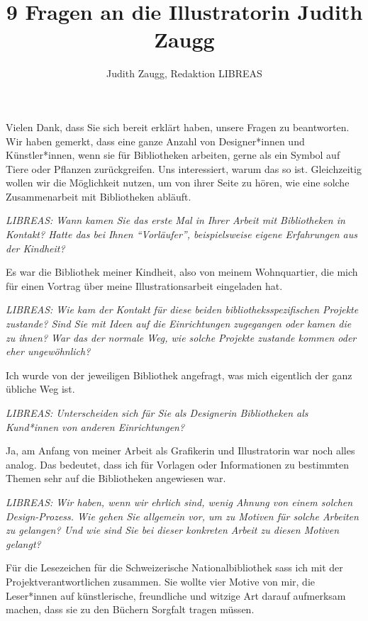 \documentclass[a4paper,
fontsize=11pt,
oneside,
numbers=noperiodatend,
parskip=half-,
bibliography=totoc,
final
]{scrartcl}
\title{\LARGE{9 Fragen an die Illustratorin Judith Zaugg}}%
\author{Judith Zaugg, Redaktion LIBREAS} %
\date{}
\begin{document}
\maketitle
\thispagestyle{fancyplain} 


Vielen Dank, dass Sie sich bereit erklärt haben, unsere Fragen zu
beantworten. Wir haben gemerkt, dass eine ganze Anzahl von
Designer*innen und Künstler*innen, wenn sie für Bibliotheken arbeiten,
gerne als ein Symbol auf Tiere oder Pflanzen zurückgreifen. Uns
interessiert, warum das so ist. Gleichzeitig wollen wir die Möglichkeit
nutzen, um von ihrer Seite zu hören, wie eine solche Zusammenarbeit mit
Bibliotheken abläuft.

\emph{LIBREAS: Wann kamen Sie das erste Mal in Ihrer Arbeit mit
Bibliotheken in Kontakt? Hatte das bei Ihnen \enquote{Vorläufer},
beispielsweise eigene Erfahrungen aus der Kindheit?}

Es war die Bibliothek meiner Kindheit, also von meinem Wohnquartier, die
mich für einen Vortrag über meine Illustrationsarbeit eingeladen hat.

\emph{LIBREAS: Wie kam der Kontakt für diese beiden
bibliotheksspezifischen Projekte zustande? Sind Sie mit Ideen auf die
Einrichtungen zugegangen oder kamen die zu ihnen? War das der normale
Weg, wie solche Projekte zustande kommen oder eher ungewöhnlich?}

Ich wurde von der jeweiligen Bibliothek angefragt, was mich eigentlich
der ganz übliche Weg ist.

\emph{LIBREAS: Unterscheiden sich für Sie als Designerin Bibliotheken
als Kund*innen von anderen Einrichtungen?}

Ja, am Anfang von meiner Arbeit als Grafikerin und Illustratorin war
noch alles analog. Das bedeutet, dass ich für Vorlagen oder
Informationen zu bestimmten Themen sehr auf die Bibliotheken angewiesen
war.

\emph{LIBREAS: Wir haben, wenn wir ehrlich sind, wenig Ahnung von einem
solchen Design-Prozess. Wie gehen Sie allgemein vor, um zu Motiven für
solche Arbeiten zu gelangen? Und wie sind Sie bei dieser konkreten
Arbeit zu diesen Motiven gelangt?}

Für die Lesezeichen für die Schweizerische Nationalbibliothek sass ich
mit der Projektverantwortlichen zusammen. Sie wollte vier Motive von
mir, die Leser*innen auf künstlerische, freundliche und witzige Art
darauf aufmerksam machen, dass sie zu den Büchern Sorgfalt tragen
müssen.
\end{document}
